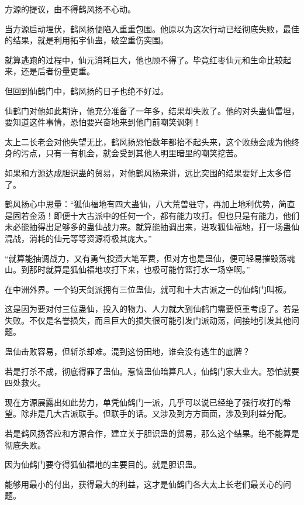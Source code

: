 
\begin{this_body}

方源的提议，由不得鹤风扬不心动。

当方源启动埋伏，鹤风扬便陷入重重包围。他原以为这次行动已经彻底失败，最佳的结果，就是利用拓宇仙蛊，破空重伤突围。

就算逃跑的过程中，仙元消耗巨大，他也顾不得了。毕竟红枣仙元和生命比较起来，还是后者份量更重。

但回到仙鹤门中，鹤风扬的日子也绝不好过。

仙鹤门对他如此期许，他充分准备了一年多，结果却失败了。他的对头蛊仙雷坦，要知道这件事情，恐怕要兴奋地来到他门前嘲笑讽刺！

太上二长老会对他失望无比，鹤风扬恐怕数年都抬不起头来，这个败绩会成为他终身的污点，只有一有机会，就会受到其他人明里暗里的嘲笑挖苦。

如果和方源达成胆识蛊的贸易，对他鹤风扬来讲，远比突围的结果要好上太多倍了。

鹤风扬心中思量：“狐仙福地有四大蛊仙，八大荒兽驻守，再加上地利优势，简直是固若金汤！即便十大古派中的任何一个，都有能力攻打。但也只是有能力，他们未必能抽得出足够多的蛊仙战力来。就算能抽调出来，进攻狐仙福地，打一场蛊仙混战，消耗的仙元等等资源将极其庞大。”

“就算能抽调战力，又有勇气投资大笔军费，但对方也是蛊仙，便可轻易摧毁荡魂山。到那时就算是狐仙福地攻打下来，也极可能竹篮打水一场空啊。”

在中洲外界。一个钧天剑派拥有三位蛊仙，就可和十大古派之一的仙鹤门叫板。

这是因为要对付三位蛊仙，投入的物力、人力就大到仙鹤门需要慎重考虑了。若是失败。不仅是名誉损失，而且巨大的损失很可能引发门派动荡，间接地引发其他问题。

蛊仙击败容易，但斩杀却难。混到这份田地，谁会没有逃生的底牌？

若是打杀不成，彻底得罪了蛊仙。惹恼蛊仙暗算凡人，仙鹤门家大业大。恐怕就要四处救火。

现在方源展露出如此势力，单凭仙鹤门一派，几乎可以说已经绝了强行攻打的希望。除非是几大古派联手。但联手的话。又涉及到方方面面，涉及到利益分配。

若是鹤风扬答应和方源合作，建立关于胆识蛊的贸易，那么这个结果。绝不能算是彻底失败。

因为仙鹤门要夺得狐仙福地的主要目的。就是胆识蛊。

能够用最小的付出，获得最大的利益，这才是仙鹤门各大太上长老们最关心的问题。


\end{this_body}
